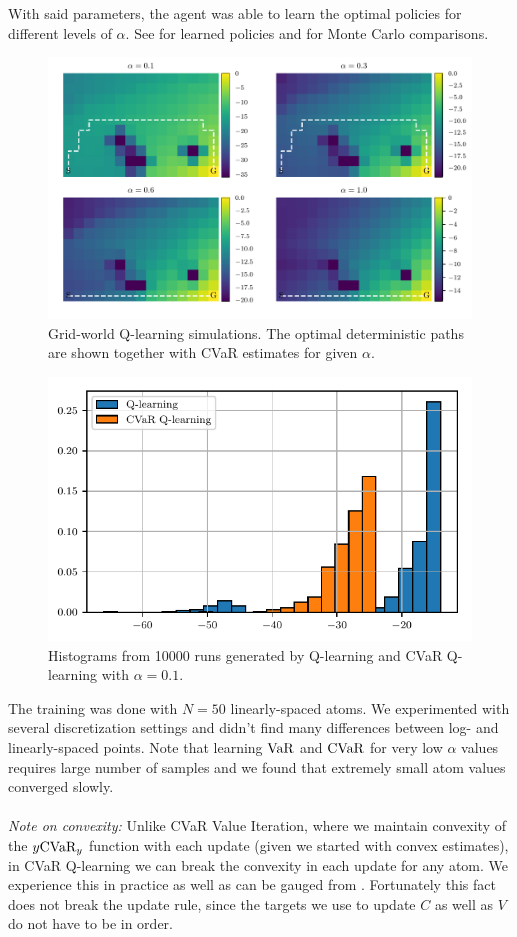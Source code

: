 With said parameters, the agent was able to learn the optimal policies for different levels of $\alpha$. See  for learned policies and  for Monte Carlo comparisons.

\begin{figure}[h]
\center
\includegraphics[width=\linewidth]{gfx/q_optimal_paths.pdf}
\caption{Grid-world Q-learning simulations. The optimal deterministic paths are shown together with CVaR estimates for given $\alpha$.}
\label{fig:qgrid}
\end{figure}


\begin{figure}[h]
\center
\includegraphics[width=0.8\linewidth]{gfx/sample_hist.pdf}
\caption{Histograms from 10000 runs generated by Q-learning and CVaR Q-learning with $\alpha=0.1$.}
\label{fig:qhist}
\end{figure}

The training was done with $N=50$ linearly-spaced atoms. We experimented with several discretization settings and didn't find many differences between log- and linearly-spaced points. Note that learning $\text{VaR}$ and $\text{CVaR}$ for very low $\alpha$ values requires large number of samples and we found that extremely small atom values converged slowly.
\\
\\
\textit{Note on convexity:} Unlike CVaR Value Iteration, where we maintain convexity of the $y\text{CVaR}_y$ function with each update (given we started with convex estimates), in CVaR Q-learning we can break the convexity in each update for any atom. We experience this in practice as well as can be gauged from . Fortunately this fact does not break the update rule, since the targets we use to update $C$ as well as $V$ do not have to be in order.


